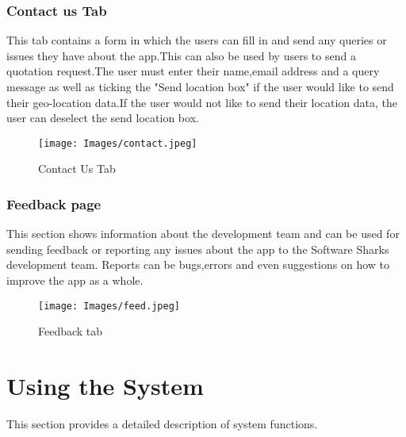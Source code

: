 \documentclass[a4paper, 12pt]{article}
\begin{document}
\pagebreak

\subsubsection{Contact us Tab}

This tab contains a form in which the users can fill in and send any queries or issues they have about the app.This can also be used by users to send a quotation request.The user must enter their name,email address and a query message as well as ticking the "Send location box" if the user would like to send their geo-location data.If the user would not like to send their location data, the user can deselect the send location box. 
\begin{figure}[H]
\texttt{[image: Images/contact.jpeg]}
\centering
\caption{Contact Us Tab} 
\end{figure}

\subsubsection{Feedback page}

This section shows information about the development team and can be used for sending feedback or reporting any issues about the app to the Software Sharks development team. Reports can be bugs,errors and even suggestions on how to improve the app as a whole. 
\begin{figure}[!ht]
\texttt{[image: Images/feed.jpeg]}
\centering
\caption{Feedback tab} 
\end{figure}
\newpage

\pagebreak
\section{Using the System}
This section provides a detailed description of system functions. 
\end{document}
